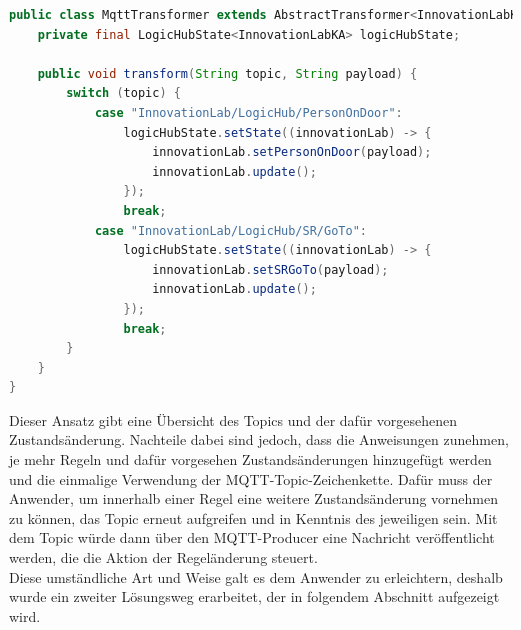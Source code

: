 \begin{lstlisting}[language=Java, frame=lines, xleftmargin=\parindent, style=algoBericht, label={code:switch-case}, captionpos=b, caption={Transformeation über eine Switch-Case-Anweisung}]
public class MqttTransformer extends AbstractTransformer<InnovationLabKA> {
    private final LogicHubState<InnovationLabKA> logicHubState;

    public void transform(String topic, String payload) {
        switch (topic) {
            case "InnovationLab/LogicHub/PersonOnDoor":
                logicHubState.setState((innovationLab) -> {
                    innovationLab.setPersonOnDoor(payload);
                    innovationLab.update();
                });
                break;
            case "InnovationLab/LogicHub/SR/GoTo":
                logicHubState.setState((innovationLab) -> {
                    innovationLab.setSRGoTo(payload);
                    innovationLab.update();
                });
                break;
        }    
    }
}
\end{lstlisting}
    Dieser Ansatz gibt eine Übersicht des Topics und der dafür vorgesehenen Zustandsänderung. Nachteile dabei sind jedoch, dass die Anweisungen 
    zunehmen, je mehr Regeln und dafür vorgesehen Zustandsänderungen hinzugefügt werden und die einmalige Verwendung der \acs{MQTT}-Topic-Zeichenkette. Dafür muss der 
    Anwender, um innerhalb einer Regel eine weitere Zustandsänderung vornehmen zu können, das Topic erneut aufgreifen und in Kenntnis des jeweiligen sein. Mit dem 
    Topic würde dann über den \acs{MQTT}-Producer eine Nachricht veröffentlicht werden, die die Aktion der Regeländerung steuert. 
    \\
    Diese umständliche Art und Weise galt es dem Anwender zu erleichtern, deshalb wurde ein zweiter Lösungsweg erarbeitet, der in folgendem Abschnitt 
    aufgezeigt wird.

